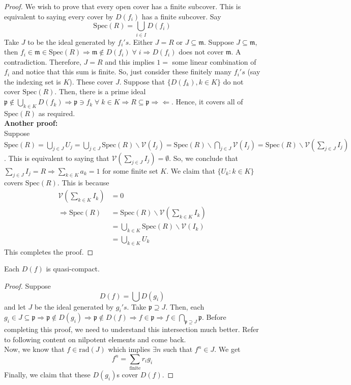 \documentclass[oneside, 12pt, ]{scrbook}
\newcommand{\V}{\mathcal{V}}
\newcommand{\spec}{\mathrm{Spec}}
\newcommand{\pr}{\mathfrak{p}}
\newcommand{\m}{\mathfrak{m}}
\theoremstyle{theorem}
\begin{document}
\begin{proof}
We wish to prove that every open cover has a finite subcover. This is equivalent to saying every cover by $D(f_{i})$ has a finite subcover. Say $$\spec(R) = \bigcup_{i \in I} D(f_{i})$$ Take $J$ to be the ideal generated by $f_{i}'s$. Either $J = R$ or $J \subseteq \mathfrak{m}$. Suppose $J \subseteq \m$, then $f_{i} \in \m \in \spec(R) \Rightarrow \m \not \in D(f_{i}) \; \forall \; i \Rightarrow D(f_{i})$ does not cover $\m$. A contradiction. Therefore, $J=R$ and this implies $1 =$ some linear combination of $f_{i}$ and notice that this sum is finite. So, just consider these finitely many $f_{i}'s$ (say the indexing set is $K$). These cover $J$. Suppose that $\{ D(f_{k}), k \in K\}$ do not cover $\spec(R)$. Then, there is a prime ideal $\pr \not \in \bigcup_{k\in K}D(f_{k}) \Rightarrow \pr \ni f_{k} \; \forall\; k \in K \Rightarrow R \subseteq \pr \Rightarrow \Leftarrow$. Hence, it covers all of $\spec(R)$ as required. \\

\textbf{Another proof:}\\
Suppose $\spec(R) = \bigcup_{j \in J} U_{j} = \bigcup_{j \in J} \spec(R) \backslash \V(I_{j}) = \spec(R) \backslash \bigcap_{j \in J} \V(I_{j}) =\spec(R) \backslash \V(\sum_{j \in J} I_{j})$. This is equivalent to saying that $\V(\sum_{j \in J} I_{j}) = \emptyset$. So, we conclude that $\sum_{j \in J}I_{j} = R \Rightarrow \sum_{k \in K}a_{k} = 1$ for some finite set $K$. We claim that $\{U_{k}: k \in K\}$ covers $\spec(R)$. This is because 
\begin{align*}
\V(\sum_{k\in K} I_{k}) &= 0 \\
\Rightarrow \spec(R) &= \spec(R) \backslash \V(\sum_{k\in K} I_{k})  \\
&= \bigcup_{k \in K} \spec(R) \backslash \V(I_{k}) \\
&= \bigcup_{k \in K} U_{k}
\end{align*}
This completes the proof. 
\end{proof}

\begin{proposition}
Each $D(f)$ is quasi-compact.
\end{proposition}

\begin{proof}
Suppose $$D(f) = \bigcup D(g_{i})$$ and let $J$ be the ideal generated by $g_{i}'s$. Take $\mathfrak{p} \supseteq J$. Then, each $g_{i} \in J \subseteq \mathfrak{p} \Rightarrow \mathfrak{p} \not \in D(g_{i}) \Rightarrow \mathfrak{p} \not \in D(f) \Rightarrow f \in \mathfrak{p} \Rightarrow f \in \bigcap_{\mathfrak{p} \supseteq J} \mathfrak{p}$. \textcolor{BrickRed}{Before completing this proof, we need to understand this intersection much better. Refer to following content on nilpotent elements and come back.}\\
Now, we know that $f \in \mathrm{rad}(J)$ which implies $\exists n$ such that $f^n \in J$. We get $$f^n = \sum_{\text{finite}} r_{i}g_{i}$$ Finally, we claim that these $D(g_{i})$s cover $D(f)$. 
\end{proof}
\end{document}
